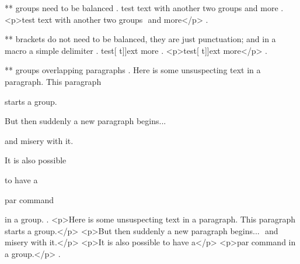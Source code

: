 ** groups need to be balanced
.
test {text with {{another }two} groups } and more
.
<p>test text with another two​ groups ​ and more</p>
.


** brackets do not need to be balanced, they are just punctuation; and in a macro a simple delimiter
.
test[ {t]]ext} more
.
<p>test[ t]]ext​ more</p>
.


** groups overlapping paragraphs
.
Here is some unsuspecting text in a paragraph. This paragraph { starts a group.

But then suddenly a new paragraph begins... } and misery with it.

It is also possible {to have a\par par command} in a group.
.
<p>Here is some unsuspecting text in a paragraph. This paragraph ​ starts a group.</p>
<p>But then suddenly a new paragraph begins... ​ and misery with it.</p>
<p>It is also possible to have a</p>
<p>par command​ in a group.</p>
.
